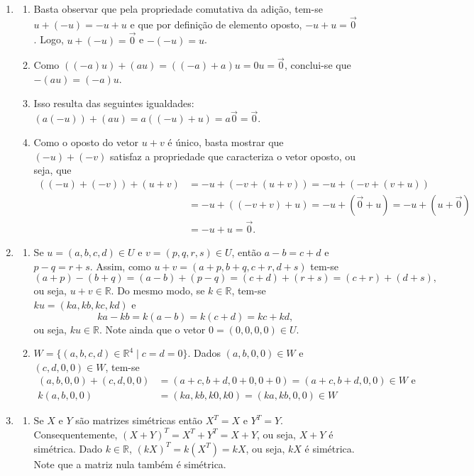 \documentclass[12pt,a4paper]{article}
\newcommand*\R{\mathbb{R}}
\begin{document}
\begin{enumerate}
\item \begin{enumerate}
\item Basta observar que pela propriedade comutativa da adição, tem-se $u + (-u) = -u + u$ e que por definição de elemento oposto, $-u + u = \vec{0}$. Logo, $u + (-u) = \vec{0}$ e $-(-u) = u$.
\item Como $((-a) u) + (a u)
= ((-a) + a) u
= 0 u
= \vec{0}$, conclui-se que $-(a u) = (-a) u$.
\item Isso resulta das seguintes igualdades: $(a (-u)) + (a u)
= a((-u) + u)
= a \vec{0}
= \vec{0}$.
\item Como o oposto do vetor $u+v$ é único, basta mostrar que $(-u) + (-v)$ satisfaz a propriedade que caracteriza o vetor oposto, ou seja, que
\begin{align*}
  ((-u) + (-v)) + (u+v)
& = -u + (-v + (u+v))
  = -u + (-v + (v+u))\\
& = -u + ((-v + v)+u)
  = -u + (\vec{0}+u)
  = -u + (u+\vec{0})\\
& = -u + u
  = \vec{0}.
\end{align*}
\end{enumerate}

\item
\begin{enumerate}
\item Se $u = (a,b,c,d) \in U$ e $v = (p,q,r,s) \in U$, então $a-b = c+d$ e $p-q = r+s$. Assim, como $u + v = (a+p,b+q,c+r,d+s)$ tem-se
\[
(a+p) - (b+q)
= (a-b) + (p-q)
= (c+d) + (r+s)
= (c+r) + (d+s),
\]
ou seja, $u + v \in \R$. Do mesmo modo, se $k \in \R$, tem-se $k u = (ka, kb, kc, kd)$ e
\[
ka - kb
= k(a-b)
= k(c+d)
= kc+kd,
\]
ou seja, $ku \in \R$. Note ainda que o vetor $0 = (0,0,0,0) \in U$.
\item $W = \{ (a,b,c,d) \in \R^4 \mid c = d = 0 \}$.
Dados $(a,b,0,0) \in W$ e $(c,d,0,0) \in W$, tem-se
\begin{align*}
(a,b,0,0) + (c,d,0,0)
& = (a+c,b+d,0+0,0+0)
  = (a+c,b+d,0,0)
\in W \text{ e} \\
 k( a,  b, 0, 0)
& = (ka, kb, k0, k0)
  = (ka, kb, 0, 0)
\in W
\end{align*}
\end{enumerate}
\item
\begin{enumerate}
\item Se $X$ e $Y$ são matrizes simétricas então $X^T = X$ e $Y^T = Y$. Consequentemente, $(X+Y)^T = X^T+Y^T = X + Y$, ou seja, $X+Y$ é simétrica. Dado $k \in \R$, $(kX)^T = k(X^T) = kX$, ou seja, $kX$ é simétrica. Note que a matriz nula também é simétrica.


\end{enumerate}
\end{enumerate}
\end{document}
